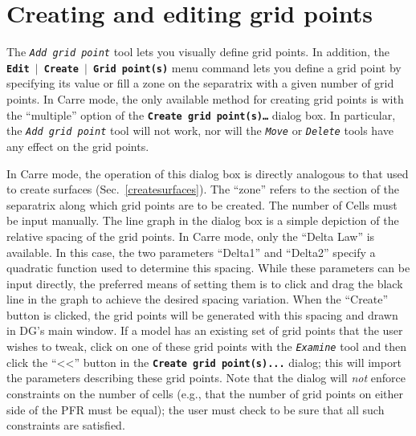 \documentclass[12pt]{report}
\begin{document}


\section{Creating and editing grid points}

The \textit{\texttt{Add grid point}} tool lets you visually define
grid points. In addition, the
\textbf{\texttt{Edit  \begin{math}\vert{}\end{math}  Create  \begin{math}\vert{}\end{math}  Grid
point(s)}} menu command lets you define a grid point by specifying its
value or fill a zone on the separatrix with a given number of grid
points.  
In Carre mode, the only available method for creating grid points 
is with the ``multiple'' option of the 
\textbf{\texttt{Create grid point(s)\ldots}}
dialog box.  In particular, the \textit{\texttt{Add grid point}} tool
will not work, nor will the \textit{\texttt{Move}} or
\textit{\texttt{Delete}} tools have any
effect on the grid points.

In Carre mode, the operation of this dialog box is directly
analogous to that used to create surfaces (Sec.~\ref{createsurfaces}).
The ``zone'' refers to the section of the separatrix along which
grid points are to be created.
The number
of Cells must be input manually.  The line graph in the dialog box is a
simple depiction of the relative spacing of the grid points.  In Carre mode,
only the ``Delta Law'' is available.  In this case, the two parameters
``Delta1'' and ``Delta2'' specify a quadratic function used to determine
this spacing.  While these parameters can be input directly, the preferred
means of setting them is to click and drag the black line in the graph to
achieve the desired spacing variation.  When the ``Create'' button is
clicked, the grid points will be generated with this spacing and drawn in 
DG's main window.  If a model has an existing set of grid points that the
user wishes to tweak, click on one 
of these grid points with the \textit{\texttt{Examine}} tool and then
click the ``<<'' button in the \textbf{\texttt{Create grid point(s)...}} 
dialog; this will
import the parameters describing these grid points.
Note that the dialog will {\em not} enforce constraints on the number of
cells (e.g., that the number of grid points on either side of the
PFR must be equal); the
user must check to be sure that all such constraints are satisfied.
\end{document}
